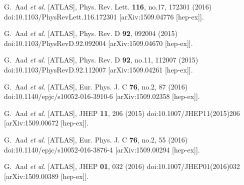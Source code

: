 \begin{thebibliography}{9}
G.~Aad \textit{et al.} [ATLAS],
Phys. Rev. Lett. \textbf{116}, no.17, 172301 (2016)
doi:10.1103/PhysRevLett.116.172301
[arXiv:1509.04776 [hep-ex]].

G.~Aad \textit{et al.} [ATLAS],
Phys. Rev. D \textbf{92}, 092004 (2015)
doi:10.1103/PhysRevD.92.092004
[arXiv:1509.04670 [hep-ex]].

G.~Aad \textit{et al.} [ATLAS],
Phys. Rev. D \textbf{92}, no.11, 112007 (2015)
doi:10.1103/PhysRevD.92.112007
[arXiv:1509.04261 [hep-ex]].

G.~Aad \textit{et al.} [ATLAS],
Eur. Phys. J. C \textbf{76}, no.2, 87 (2016)
doi:10.1140/epjc/s10052-016-3910-6
[arXiv:1509.02358 [hep-ex]].

G.~Aad \textit{et al.} [ATLAS],
JHEP \textbf{11}, 206 (2015)
doi:10.1007/JHEP11(2015)206
[arXiv:1509.00672 [hep-ex]].

G.~Aad \textit{et al.} [ATLAS],
Eur. Phys. J. C \textbf{76}, no.2, 55 (2016)
doi:10.1140/epjc/s10052-016-3876-4
[arXiv:1509.00294 [hep-ex]].

G.~Aad \textit{et al.} [ATLAS],
JHEP \textbf{01}, 032 (2016)
doi:10.1007/JHEP01(2016)032
[arXiv:1509.00389 [hep-ex]].


\end{thebibliography}
